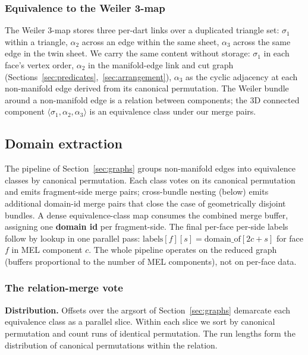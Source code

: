 \documentclass{egpubl}
\begin{document}
\subsubsection*{Equivalence to the Weiler 3-map}

The Weiler 3-map \cite{Weiler1985,Levy2025} stores three per-dart links over a duplicated triangle set: $\sigma_1$ within a triangle, $\alpha_2$ across an edge within the same sheet, $\alpha_3$ across the same edge in the twin sheet. We carry the same content without storage: $\sigma_1$ in each face's vertex order, $\alpha_2$ in the manifold-edge link and cut graph (Sections~\ref{sec:predicates},~\ref{sec:arrangement}), $\alpha_3$ as the cyclic adjacency at each non-manifold edge derived from its canonical permutation. The Weiler bundle around a non-manifold edge is a relation between components; the 3D connected component $\langle\sigma_1, \alpha_2, \alpha_3\rangle$ is an equivalence class under our merge pairs.

\subsection{Domain extraction}
\label{sec:aggregation}

The pipeline of Section~\ref{sec:graphs} groups non-manifold edges into equivalence classes by canonical permutation. Each class votes on its canonical permutation and emits fragment-side merge pairs; cross-bundle nesting (below) emits additional domain-id merge pairs that close the case of geometrically disjoint bundles. A dense equivalence-class map consumes the combined merge buffer, assigning one \textbf{domain id} per fragment-side. The final per-face per-side labels follow by lookup in one parallel pass: $\text{labels}[f][s] = \text{domain\_of}[2c + s]$ for face $f$ in MEL component $c$. The whole pipeline operates on the reduced graph (buffers proportional to the number of MEL components), not on per-face data.

\subsubsection*{The relation-merge vote}

\textbf{Distribution.} Offsets over the argsort of Section~\ref{sec:graphs} demarcate each equivalence class as a parallel slice. Within each slice we sort by canonical permutation and count runs of identical permutation. The run lengths form the distribution of canonical permutations within the relation.
\end{document}
